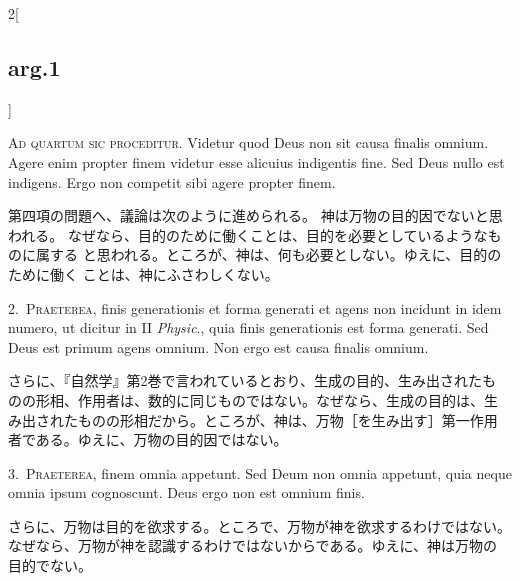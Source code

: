 \documentclass[paper=a4paper,fontsize=10pt,jafontsize=9pt,titlepage]{jlreq}
\begin{document}
\begin{paracol}{2}[\subsection{arg.1}]

{\huge A}{\scshape d quartum sic proceditur}. Videtur quod
Deus non sit causa finalis omnium. Agere enim propter finem videtur esse
alicuius indigentis fine. Sed Deus nullo est indigens. Ergo non competit
sibi agere propter finem.

\switchcolumn

第四項の問題へ、議論は次のように進められる。
神は万物の目的因でないと思われる。
なぜなら、目的のために働くことは、目的を必要としているようなものに属する
 と思われる。ところが、神は、何も必要としない。ゆえに、目的のために働く
 ことは、神にふさわしくない。


2.~{\scshape Praeterea}, finis generationis et forma generati et agens
non incidunt in idem numero, ut dicitur in II {\itshape Physic}., quia
finis generationis est forma generati. Sed Deus est primum agens
omnium. Non ergo est causa finalis omnium.

\switchcolumn

さらに、『自然学』第2巻で言われているとおり、生成の目的、生み出されたも
 のの形相、作用者は、数的に同じものではない。なぜなら、生成の目的は、生
 み出されたものの形相だから。ところが、神は、万物［を生み出す］第一作用
 者である。ゆえに、万物の目的因ではない。


3.~{\scshape Praeterea}, finem omnia appetunt. Sed Deum
non omnia appetunt, quia neque omnia ipsum cognoscunt. Deus ergo non est
omnium finis.

\switchcolumn

さらに、万物は目的を欲求する。ところで、万物が神を欲求するわけではない。
 なぜなら、万物が神を認識するわけではないからである。ゆえに、神は万物の
 目的でない。



\end{paracol}
\end{document}
